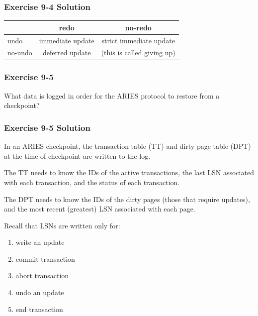 \begin{frame}
\frametitle{Exercise 9-4 Solution}

\begin{center}
\begin{tabular}{ | l | c | c | }
  \hline
          & redo & no-redo \\
  \hline
  undo    & immediate update & strict immediate update \\
  \hline
  no-undo & deferred update & (this is called giving up) \\
  \hline
\end{tabular}
\end{center}

\end{frame}


\begin{frame}
\frametitle{Exercise 9-5}
  What data is logged in order for the ARIES protocol to restore from a checkpoint?
\end{frame}


\begin{frame}
\frametitle{Exercise 9-5 Solution}
  In an ARIES checkpoint, the transaction table (TT) and dirty page table (DPT) at the time of checkpoint are written to the log.

  The TT needs to know the IDs of the active transactions, the last LSN associated with each transaction, and the status of each transaction.

  The DPT needs to know the IDs of the dirty pages (those that require updates), and the most recent (greatest) LSN associated with each page.

  Recall that LSNs are written only for:
  \begin{enumerate}
    \item write an update
    \item commit transaction
    \item abort transaction
    \item undo an update
    \item end transaction
  \end{enumerate}
\end{frame}


